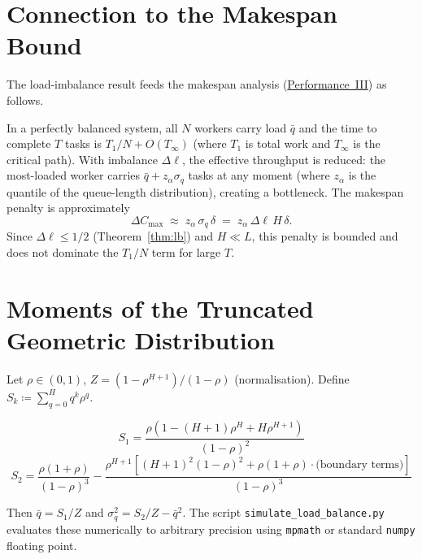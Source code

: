 \documentclass[11pt,a4paper]{report}
\begin{document}
\section{Connection to the Makespan Bound}

The load-imbalance result feeds the makespan analysis
(\hyperref[chap:makespan]{Performance~III}) as follows.

In a perfectly balanced system, all $N$ workers carry load
$\bar{q}$ and the time to complete $T$ tasks is
$T_1/N + O(T_\infty)$ (where $T_1$ is total work and $T_\infty$
is the critical path).  With imbalance $\Delta\ell$, the
effective throughput is reduced: the most-loaded worker carries
$\bar{q} + z_\alpha \sigma_q$ tasks at any moment (where
$z_\alpha$ is the quantile of the queue-length distribution),
creating a bottleneck.  The makespan penalty is approximately
\[
  \Delta C_{\max} \;\approx\; z_\alpha\,\sigma_q\,\delta
                  \;=\; z_\alpha\,\Delta\ell\,H\,\delta.
\]
Since $\Delta\ell \leq 1/2$ (Theorem~\ref{thm:lb}) and
$H \ll L$, this penalty is bounded and does not dominate the
$T_1/N$ term for large $T$.

\section{Moments of the Truncated Geometric Distribution}

Let $\rho \in (0,1)$, $Z = (1-\rho^{H+1})/(1-\rho)$ (normalisation).
Define $S_k \coloneqq \sum_{q=0}^{H} q^k \rho^q$.

\[
  S_1 = \frac{\rho(1-(H+1)\rho^H + H\rho^{H+1})}{(1-\rho)^2}
\]
\[
  S_2 = \frac{\rho(1+\rho)}{(1-\rho)^3}
        - \frac{\rho^{H+1}[(H+1)^2(1-\rho)^2 + \rho(1+\rho) \cdot \text{(boundary terms)}]}{(1-\rho)^3}
\]

Then $\bar{q} = S_1/Z$ and $\sigma_q^2 = S_2/Z - \bar{q}^2$.
The script \texttt{simulate\_load\_balance.py} evaluates these
numerically to arbitrary precision using \texttt{mpmath} or
standard \texttt{numpy} floating point.


\end{document}
